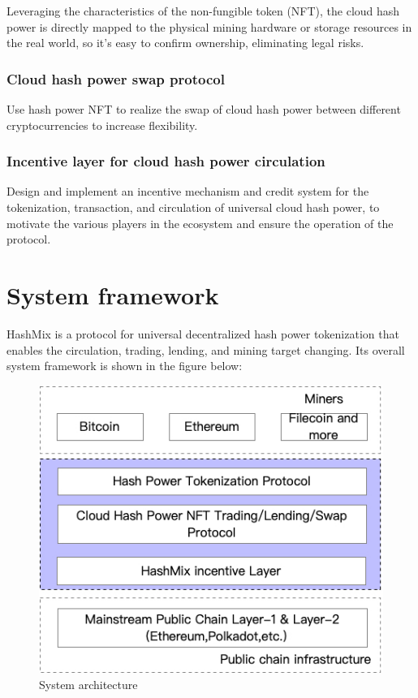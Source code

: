 \documentclass[]{template/llncs}
\begin{document}
Leveraging the characteristics of the non-fungible token (NFT), the cloud hash power is directly mapped to the physical mining hardware or storage resources in the real world, so it’s easy to confirm ownership, eliminating legal risks.

\subsubsection{Cloud hash power swap protocol}

Use hash power NFT to realize the swap of cloud hash power between different cryptocurrencies to increase flexibility.

\subsubsection{Incentive layer for cloud hash power circulation}

Design and implement an incentive mechanism and credit system for the tokenization, transaction, and circulation of universal cloud hash power, to motivate the various players in the ecosystem and ensure the operation of the protocol.

\section{System framework}

HashMix is a protocol for universal decentralized hash power tokenization that enables the circulation, trading, lending, and mining target changing. Its overall system framework is shown in the figure below:

\begin{figure}[htbp]
\centering
\includegraphics[width=0.9\columnwidth]{figure/system-architecture-en}
\caption{System architecture}
\label{fig:arch}
\end{figure}
\end{document}
